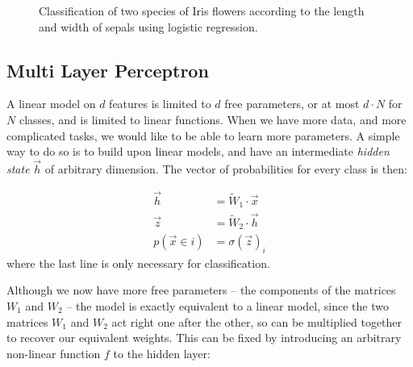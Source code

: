 \begin{figure}
	\centering
	\caption{Classification of two species of Iris flowers according to the length and width of sepals using logistic regression.}\label{fig:logistic}
\end{figure}


\subsection{Multi Layer Perceptron}\label{sec:mlp}
A linear model on $d$ features is limited to $d$ free parameters, or at most $d \cdot N$ for $N$ classes, and is limited to linear functions.
When we have more data, and more complicated tasks, we would like to be able to learn more parameters.
A simple way to do so is to build upon linear models, and have an intermediate \emph{hidden state} $\vec{h}$ of arbitrary dimension.
The vector of probabilities for every class is then:

\begin{align*}
\vec{h} &= \widetilde W_1 \cdot \vec{x} \\
\vec{z} &= \widetilde W_2 \cdot \vec{h} \\
p(\vec x \in i) &= \sigma(\vec z)_i
\end{align*}
where the last line is only necessary for classification.

Although we now have more free parameters -- the components of the matrices $W_1$ and $W_2$ -- the model is exactly equivalent to a linear model, since the two matrices $W_1$ and $W_2$ act right one after the other, so can be multiplied together to recover our equivalent weights.
This can be fixed by introducing an arbitrary non-linear function $f$ to the hidden layer:

